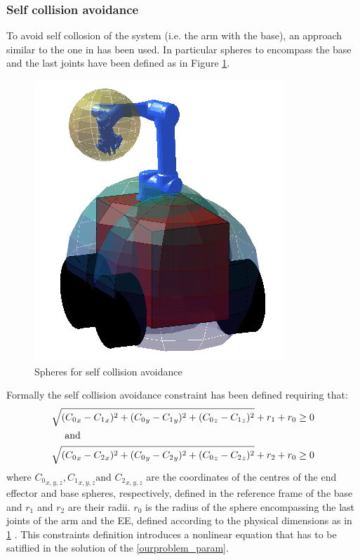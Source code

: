 \subsubsection*{Self collision avoidance}
	To avoid self collosion of the system (i.e. the arm with the base), an approach similar to the one in \cite{sandberg1988collision} has been used. In particular spheres to encompass the base and the last joints have been defined as in Figure \ref{spheres_3d}.
	\begin{figure}[h!]
	\centering
	\includegraphics[scale=0.4]{IMMAGINI/spheres_3d.png}
	\caption{Spheres for self collision avoidance}
	\label{spheres_3d}	
	\end{figure}
	Formally the self collision avoidance constraint has been defined requiring that: 
	\begin{equation}
	\begin{split} 
		&\sqrt{({C_0}_x-{C_1}_x)^2+({C_0}_y-{C_1}_y)^2+({C_0}_z-{C_1}_z)^2} + r_1 +r_0 \geq 0 \\
		&\ \ \ \ \textnormal{and} \\
		&\sqrt{({C_0}_x-{C_2}_x)^2+({C_0}_y-{C_2}_y)^2+({C_0}_z-{C_2}_z)^2} + r_2 +r_0 \geq 0 \\
	\end{split}
	\label{spheres_const}
	\end{equation}
	where ${C_0}_{x,y,z},{C_1}_{x,y,z} \text{and }{C_2}_{x,y,z}$ are the coordinates of the centres of the end effector and base spheres, respectively, defined in the reference frame of the base and $r_1$ and $r_2$ are their radii. $r_0$ is the radius of the sphere encompassing the last joints of the arm and the EE, defined according to the physical dimensions as in \ref{spheres_3d} . This constraints definition introduces a nonlinear equation that has to be satiflied in the solution of the \ref{ourproblem_param}. \\

